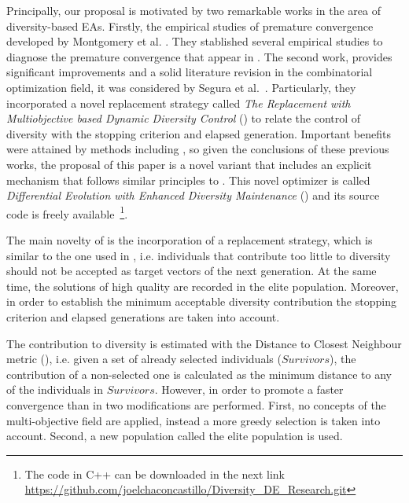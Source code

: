 Principally, our proposal is motivated by two remarkable works in the area of diversity-based EAs.
%
Firstly, the empirical studies of premature convergence developed by Montgomery et al. \cite{montgomery2012simple}.
%
They stablished several empirical studies to diagnose the premature convergence that appear in \DE{}.
%
The second work, provides significant improvements and a solid literature revision in the combinatorial optimization field, it was considered by Segura et al.~\cite{segura2016novel}.
%
Particularly, they incorporated a novel replacement strategy called \textit{The Replacement with Multiobjective based Dynamic Diversity Control} (\RMDDC{}) to relate the control of diversity with the stopping criterion and elapsed generation.
%
Important benefits were attained by methods including \RMDDC{}, so given the conclusions of these previous works, the proposal of this paper is a 
novel \DE{} variant that includes an explicit mechanism that follows similar principles to \RMDDC{}.
%
This novel optimizer is called \textit{Differential Evolution with Enhanced Diversity Maintenance} (\DEEDM{}) and its source
code is freely available~\footnote{The code in C++ can be downloaded in the next link \url{https://github.com/joelchaconcastillo/Diversity\_DE\_Research.git}}.

The main novelty of \DEEDM{} is the incorporation of a replacement strategy, which is similar to the one used in \RMDDC{}, i.e.
individuals that contribute too little to diversity should not be accepted as target vectors of the next generation.
%
At the same time, the solutions of high quality are recorded in the elite population.
%
Moreover, in order to establish the minimum acceptable diversity contribution the stopping criterion and elapsed
generations are taken into account.

The contribution to diversity is estimated with the Distance to Closest Neighbour metric (\DCN{}), i.e. given
a set of already selected individuals ($Survivors$), the contribution of a non-selected one is calculated as the minimum
distance to any of the individuals in $Survivors$.
%
However, in order to promote a faster convergence than in \RMDDC{} two modifications are performed.
%
First, no concepts of the multi-objective field are applied, instead a more greedy selection is taken into account.
%
Second, a new population called the elite population is used.

